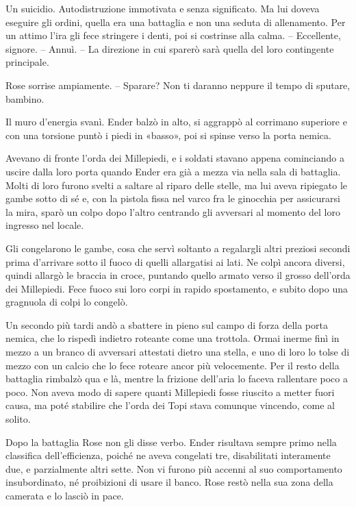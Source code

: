 {Un suicidio. Autodistruzione immotivata e senza significato. Ma lui
	doveva eseguire gli ordini, quella era una battaglia e non una seduta di
	allenamento. Per un attimo l'ira gli fece stringere i denti, poi si
	costrinse alla calma. -- Eccellente, signore. -- Annuì. -- La direzione
	in cui sparerò sarà quella del loro contingente principale.}

{Rose sorrise ampiamente. -- Sparare? Non ti daranno neppure il tempo di
	sputare, bambino.}

{Il muro d'energia svanì. Ender balzò in alto, si aggrappò al corrimano
	superiore e con una torsione puntò i piedi in «basso», poi si spinse
	verso la porta nemica.}

{Avevano di fronte l'orda dei Millepiedi, e i soldati stavano appena
	cominciando a uscire dalla loro porta quando Ender era già a mezza via
	nella sala di battaglia. Molti di loro furono svelti a saltare al riparo
	delle stelle, ma lui aveva ripiegato le gambe sotto di sé e, con la
	pistola fissa nel varco fra le ginocchia per assicurarsi la mira, sparò
	un colpo dopo l'altro centrando gli avversari al momento del loro
	ingresso nel locale.}

{Gli congelarono le gambe, cosa che servì soltanto a regalargli altri
	preziosi secondi prima d'arrivare sotto il fuoco di quelli allargatisi
	ai lati. Ne colpì ancora diversi, quindi allargò le braccia in croce,
	puntando quello armato verso il grosso dell'orda dei Millepiedi. Fece
	fuoco sui loro corpi in rapido spostamento, e subito dopo una gragnuola
	di colpi lo congelò.}

{Un secondo più tardi andò a sbattere in pieno sul campo di forza della
	porta nemica, che lo rispedì indietro roteante come una trottola. Ormai
	inerme finì in mezzo a un branco di avversari attestati dietro una
	stella, e uno di loro lo tolse di mezzo con un calcio che lo fece
	roteare ancor più velocemente. Per il resto della battaglia rimbalzò qua
	e là, mentre la frizione dell'aria lo faceva rallentare poco a poco. Non
	aveva modo di sapere quanti Millepiedi fosse riuscito a metter fuori
	causa, ma poté stabilire che l'orda dei Topi stava comunque vincendo,
	come al solito.}

{Dopo la battaglia Rose non gli disse verbo. Ender risultava sempre
	primo nella classifica dell'efficienza, poiché ne aveva congelati tre,
	disabilitati interamente due, e parzialmente altri sette. Non vi furono
	più accenni al suo comportamento insubordinato, né proibizioni di usare
	il banco. Rose restò nella sua zona della camerata e lo lasciò in pace.}

